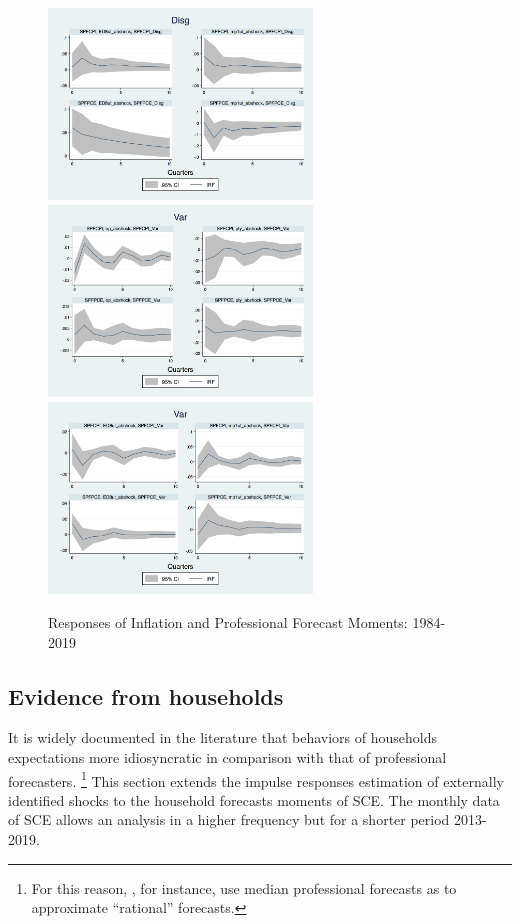 \documentclass[]{article}
\begin{document}
\begin{figure}[ht]
		\includegraphics[width=7cm]{figures/SPFDisg_ab_ashocks.png} \\
		\smallskip 
		\includegraphics[width=7cm]{figures/SPFVar_ab_ashocks_nmp.png} 
		\includegraphics[width=7cm]{figures/SPFVar_ab_ashocks.png} 
		\caption{Responses of Inflation and Professional Forecast Moments: 1984-2019}
		\label{ReplicateCoibionwholeperiod}
	\end{figure}
	
	
	\subsection{Evidence from households}
	
	It is widely documented in the literature that behaviors of households expectations more idiosyncratic in comparison with that of professional forecasters. \footnote{For this reason, \cite{carroll2003macroeconomic}, for instance, use median professional forecasts as to approximate ``rational'' forecasts.} This section extends the impulse responses estimation of externally identified shocks to the household forecasts moments of SCE.  The monthly data of SCE allows an analysis in a higher frequency but for a shorter period 2013-2019. 
	
\end{document}
